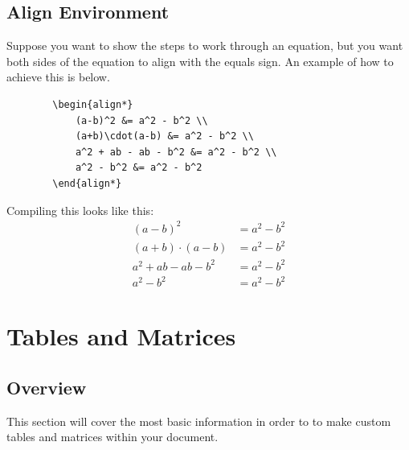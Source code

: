 \documentclass[]{article}
\newcommand{\dent}{\hspace{\parindent}} %
\begin{document}
    \subsection{Align Environment}
    \dent Suppose you want to show the steps to work through an equation, but you want both sides of the equation to align with the equals sign. An example of how to achieve this is below.
    \begin{verbatim}
        \begin{align*}
            (a-b)^2 &= a^2 - b^2 \\
            (a+b)\cdot(a-b) &= a^2 - b^2 \\
            a^2 + ab - ab - b^2 &= a^2 - b^2 \\
            a^2 - b^2 &= a^2 - b^2
        \end{align*}
    \end{verbatim}
    Compiling this looks like this:
    \begin{align*}
        (a-b)^2 &= a^2 - b^2 \\
        (a+b)\cdot(a-b) &= a^2 - b^2 \\
        a^2 + ab - ab - b^2 &= a^2 - b^2 \\
        a^2 - b^2 &= a^2 - b^2
    \end{align*}
    \section{Tables and Matrices}
    \subsection{Overview}
    \dent This section will cover the most basic information in order to to make custom tables and matrices within your document.
\end{document}
